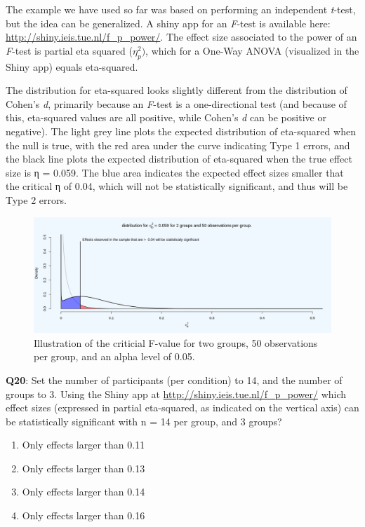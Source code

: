 \documentclass[
  oneside]{book}
\providecommand{\tightlist}{%
  \setlength{\itemsep}{0pt}\setlength{\parskip}{0pt}}
\begin{document}
The example we have used so far was based on performing an independent \emph{t}-test, but the idea can be generalized. A shiny app for an \emph{F}-test is available here: \url{http://shiny.ieis.tue.nl/f_p_power/}. The effect size associated to the power of an \emph{F}-test is partial eta squared (\(\eta_{p}^{2})\), which for a One-Way ANOVA (visualized in the Shiny app) equals eta-squared.

The distribution for eta-squared looks slightly different from the distribution of Cohen's \emph{d}, primarily because an \emph{F}-test is a one-directional test (and because of this, eta-squared values are all positive, while Cohen's \emph{d} can be positive or negative). The light grey line plots the expected distribution of eta-squared when the null is true, with the red area under the curve indicating Type 1 errors, and the black line plots the expected distribution of eta-squared when the true effect size is η = 0.059. The blue area indicates the expected effect sizes smaller that the critical η of 0.04, which will not be statistically significant, and thus will be Type 2 errors.



\begin{figure}

{\centering \includegraphics[width=1\linewidth]{images/7f6d17dc07bdc9e95ea8944d78b16d7c} 

}

\caption{Illustration of the criticial F-value for two groups, 50 observations per group, and an alpha level of 0.05.}\label{fig:critf}
\end{figure}

\textbf{Q20}: Set the number of participants (per condition) to 14, and the number of groups to 3. Using the Shiny app at \url{http://shiny.ieis.tue.nl/f_p_power/} which effect sizes (expressed in partial eta-squared, as indicated on the vertical axis) can be statistically significant with n = 14 per group, and 3 groups?

\begin{enumerate}
\def\labelenumi{\Alph{enumi})}
\tightlist
\item
  Only effects larger than 0.11
\item
  Only effects larger than 0.13
\item
  Only effects larger than 0.14
\item
  Only effects larger than 0.16
\end{enumerate}
\end{document}
